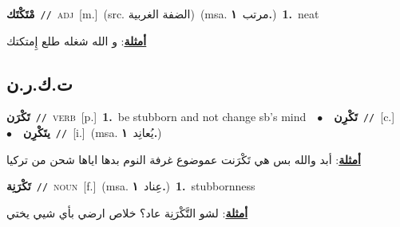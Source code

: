 \documentclass[10pt,a4paper,twoside]{article} %
\begin{document}
\begin{multicols}{2}
{\setlength\topsep{0pt}\textbf{\foreignlanguage{arabic}{مْتَكْتَك}}\ {\color{gray}\texttt{//}\color{black}}\ \textsc{adj}\ [m.]\ (src. \color{gray}\foreignlanguage{arabic}{الضفة الغربية}\color{black})\ \color{gray}(msa. \foreignlanguage{arabic}{مرتب}~\foreignlanguage{arabic}{\textbf{١.}})\color{black}\ \textbf{1.}~neat\  \begin{flushright}\color{gray}\foreignlanguage{arabic}{\textbf{\underline{\foreignlanguage{arabic}{أمثلة}}}: و الله شغله طلع إِمتكتك}\end{flushright}\color{black}} \vspace{2mm}

\vspace{-3mm}
\subsection*{\color{blue}\foreignlanguage{arabic}{ت.ك.ر.ن}\color{blue}{}} 

{\setlength\topsep{0pt}\textbf{\foreignlanguage{arabic}{تَكْرَن}}\ {\color{gray}\texttt{//}\color{black}}\ \textsc{verb}\ [p.]\ \textbf{1.}~be stubborn and not change sb's mind\ \ $\bullet$\ \ \setlength\topsep{0pt}\textbf{\foreignlanguage{arabic}{تَكْرِن}}\ {\color{gray}\texttt{//}\color{black}}\ [c.]\ \ $\bullet$\ \ \setlength\topsep{0pt}\textbf{\foreignlanguage{arabic}{يتَكْرِن}}\ {\color{gray}\texttt{//}\color{black}}\ [i.]\ \color{gray}(msa. \foreignlanguage{arabic}{يُعانِد}~\foreignlanguage{arabic}{\textbf{١.}})\color{black}\  \begin{flushright}\color{gray}\foreignlanguage{arabic}{\textbf{\underline{\foreignlanguage{arabic}{أمثلة}}}: أبد والله بس هي تَكْرَنت عموضوع غرفة النوم بدها اياها شحن من تركيا}\end{flushright}\color{black}} \vspace{2mm}

{\setlength\topsep{0pt}\textbf{\foreignlanguage{arabic}{تَكْرَنِة}}\ {\color{gray}\texttt{//}\color{black}}\ \textsc{noun}\ [f.]\ \color{gray}(msa. \foreignlanguage{arabic}{عِناد}~\foreignlanguage{arabic}{\textbf{١.}})\color{black}\ \textbf{1.}~stubbornness\  \begin{flushright}\color{gray}\foreignlanguage{arabic}{\textbf{\underline{\foreignlanguage{arabic}{أمثلة}}}: لشو التَّكْرَنِة عاد؟ خلاص ارضي بأي شيي يختي}\end{flushright}\color{black}} \vspace{2mm}


\end{multicols}
\end{document}
